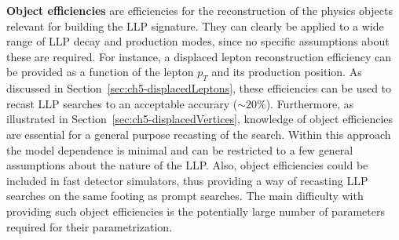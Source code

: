 {\bf Object efficiencies} are efficiencies for the reconstruction of
the physics objects relevant for building the LLP signature. 
They can clearly be applied to a wide range of LLP
decay and production modes, since no specific assumptions about these are
required. 
For instance, a displaced lepton reconstruction efficiency can be provided
as a function of the lepton $p_T$ and its production position.
As discussed in Section~\ref{sec:ch5-displacedLeptons}, these efficiencies
can be used to recast LLP searches to an acceptable accurary ($\sim 20\%$).
Furthermore, as illustrated in Section~\ref{sec:ch5-displacedVertices},
knowledge of object efficiencies are essential for a general purpose
recasting of the search.
Within this approach the model dependence is minimal and can be
restricted to a few general assumptions about the nature of the LLP.
Also, object efficiencies could be included in fast
detector simulators, thus providing a way of recasting LLP searches
on the same footing as prompt searches. 
The main difficulty with providing such object efficiencies is
the potentially large number of parameters required for their parametrization.

